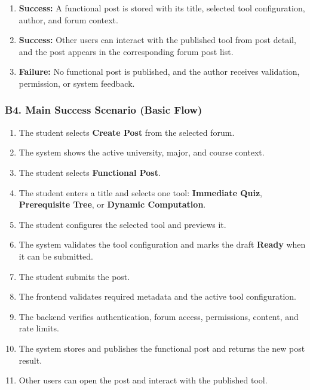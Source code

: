 \documentclass[12pt]{article}
\begin{document}
\begin{enumerate}
\item \textbf{Success:} A functional post is stored with its title, selected tool configuration, author, and forum context.
\item \textbf{Success:} Other users can interact with the published tool from post detail, and the post appears in the corresponding forum post list.
\item \textbf{Failure:} No functional post is published, and the author receives validation, permission, or system feedback.
\end{enumerate}
\par\medskip

\hypertarget{sec:b4-main-success-scenario-basic-flow}{}
\subsubsection*{B4. Main Success Scenario (Basic Flow)}
\par\medskip

\begin{enumerate}
\item The student selects \textbf{Create Post} from the selected forum.
\item The system shows the active university, major, and course context.
\item The student selects \textbf{Functional Post}.
\item The student enters a title and selects one tool: \textbf{Immediate Quiz}, \textbf{Prerequisite Tree}, or \textbf{Dynamic Computation}.
\item The student configures the selected tool and previews it.
\item The system validates the tool configuration and marks the draft \textbf{Ready} when it can be submitted.
\item The student submits the post.
\item The frontend validates required metadata and the active tool configuration.
\item The backend verifies authentication, forum access, permissions, content, and rate limits.
\item The system stores and publishes the functional post and returns the new post result.
\item Other users can open the post and interact with the published tool.
\end{enumerate}
\par\medskip
\end{document}
